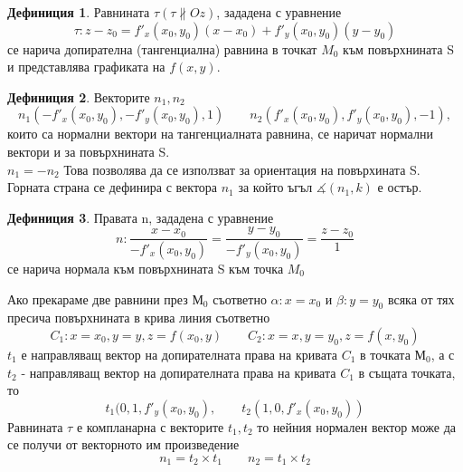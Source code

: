 \documentclass[a4paper,fleqn,12pt]{article}
\theoremstyle{definition}
\newtheorem{definition}{Дефиниция}[subsection]
\begin{document}
\begin{definition}
Равнината $\tau (\tau \nparallel Oz)$, зададена с уравнение 
$$\tau : z - z_0 = f'_x (x_0, y_0)(x - x_0) + f'_y (x_0, y_0)(y - y_0) $$
се нарича допирателна (тангенциална) равнина в точкат $M_0$ към повърхнината S и представлява графиката на $f(x,y)$. 
\end{definition}

\begin{definition}
Векторите $n_1, n_2$
$$n_1 (-f'_x (x_0, y_0), -f'_y (x_0, y_0), 1) \qquad n_2 (f'_x (x_0, y_0), f'_y (x_0, y_0), -1) ,$$ 
които са нормални вектори на тангенциалната равнина, се наричат нормални вектори и за повърхнината S. \\
$n_1 = -n_2$ Това позволява да се използват за ориентация на повърхината S. \\
Горната страна се дефинира с вектора $n_1$ за който ъгъл $\measuredangle (n_1,k)$ е остър. 
\end{definition}

\begin{definition}
Правата n, зададена с уравнение 
$$n: \dfrac{x - x_0}{-f'_x (x_0, y_0)} = \dfrac{y-y_0}{-f'_y (x_0, y_0)} = \dfrac{z - z_0}{1} $$ 
се нарича нормала към повърхнината S към точка $M_0$
\end{definition}

Ако прекараме две равнини през $М_0$ съответно $\alpha: x = x_0$ и $\beta: y = y_0$ всяка от тях пресича повърхнината в крива линия съответно
$$C_1: x = x_0, y = y, z = f(x_0, y) \qquad C_2: x = x, y = y_0, z = f(x, y_0)$$
$t_1$ е  направляващ вектор на допирателната права на кривата $C_1$ в точката $М_0$, а с $t_2$ - направляващ вектор на допирателната права на кривата $C_1$ в същата точката, то
$$t_1 (0, 1, f'_y(x_0,y_0), \qquad t_2 (1, 0, f'_x (x_0,y_0))$$
Равнината $\tau$ е компланарна с векторите $t_1, t_2$ то нейния нормален вектор може да се получи от векторното им произведение
$$n_1 = t_2 \times t_1 \qquad n_2 = t_1 \times t_2$$
\end{document}
